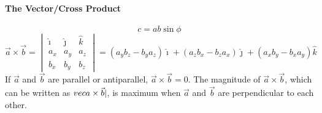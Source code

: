\documentclass{article}
\begin{document}
        \paragraph{The Vector/Cross Product}
        \begin{equation}
            c = ab \sin{\phi}
        \end{equation}
        \begin{equation}
            \vec{a} \times \vec{b} =
            \begin{vmatrix}
                \hat{\imath} & \hat{\jmath} & \hat{k} \\
                a_x & a_y & a_z \\
                b_x & b_y & b_z
            \end{vmatrix}
            = \left(a_yb_z - b_ya_z\right)\hat{\imath} + \left(a_zb_x - b_za_x\right)\hat{\jmath} + \left(a_xb_y - b_xa_y\right)\hat{k}
        \end{equation}
        If $\vec{a}$ and $\vec{b}$ are parallel or antiparallel, $\vec{a} \times \vec{b} = 0$. The magnitude of $\vec{a} \times \vec{b}$, which can be written as $\\vec{a} \times \vec{b}|$, is maximum when $\vec{a}$ and $\vec{b}$ are perpendicular to each other.
\end{document}
